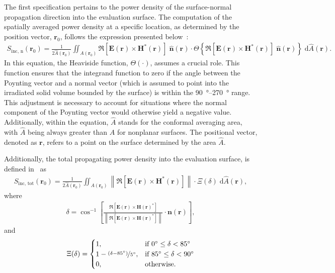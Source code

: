 The first specification pertains to the power density of the surface-normal propagation direction into the evaluation surface.
The computation of the spatially averaged power density at a specific location, as determined by the position vector, $\mathbf{r}_0$, follows the expression presented below~\cite{IEC63195-2-2022}:
\begin{align}
    \label{eqn:propagation-direction}
    S_\text{inc, n}(\mathbf{r}_0) = \frac{1}{2 \hat{A}(\mathbf{r}_0)} \iint_{A(\mathbf{r}_0)} \Re \left[ \mathbf{E}(\mathbf{r}) \times \mathbf{H}^*(\mathbf{r}) \right] \; \mathbf{\hat n}(\mathbf{r}) \cdot \Theta \left\{ \Re \left[ \mathbf{E(\mathbf{r})} \times \mathbf{H}^*(\mathbf{r}) \right] \; \mathbf{\hat n}(\mathbf{r}) \right\} \; \mathrm{d}\hat{A}(\mathbf{r}).
\end{align}
In this equation, the Heaviside function, $\Theta(\cdot)$, assumes a crucial role.
This function ensures that the integrand function to zero if the angle between the Poynting vector and a normal vector (which is assumed to point into the irradiated solid volume bounded by the surface) is within the \SIrange{90}{270}{\degree} range.
This adjustment is necessary to account for situations where the normal component of the Poynting vector would otherwise yield a negative value.
Additionally, within the equation, $\hat A$ stands for the conformal averaging area, with $\hat A$ being always greater than $A$ for nonplanar surfaces.
The positional vector, denoted as $\mathbf{r}$, refers to a point on the surface determined by the area $\hat A$.

Additionally, the total propagating power density into the evaluation surface, is defined in~\cite{IEC63195-1-2022,IEC63195-2-2022} as
\begin{align}
    \label{eqn:total}
    S_\text{inc, tot}(\mathbf{r}_0) = \frac{1}{2 \hat{A}(\mathbf{r}_0)} \iint_{A(\mathbf{r}_0)} \left\| \Re \left[ \mathbf{E}(\mathbf{r}) \times \mathbf{H}^*(\mathbf{r}) \right] \right\| \cdot \Xi \left( \delta \right) \; \mathrm{d}\hat{A}(\mathbf{r}),
\end{align}
where
\begin{align}
    \delta = \cos^{-1}\left[ {\frac{\Re \left[ \mathbf{E}(\mathbf{r}) \times \mathbf{H}(\mathbf{r})^* \right]}{\left\| \Re \left[ \mathbf{E}(\mathbf{r}) \times \mathbf{H}(\mathbf{r})^* \right] \right\|} \cdot \mathbf{n}(\mathbf{r})} \right],
\end{align}
and
\begin{align}
\Xi(\delta) = \begin{cases}
        1, & \text{if } \SI{0}{\degree} \leq \delta < \SI{85}{\degree} \\
        1 - \nicefrac{(\delta - \SI{85}{\degree})}{\SI{5}{\degree}}, & \text{if } \SI{85}{\degree} \leq \delta < \SI{90}{\degree} \\
        0, & \text{otherwise}.
    \end{cases}
\end{align}


